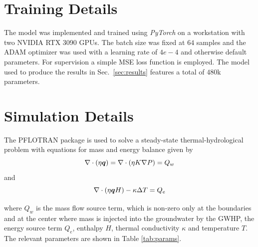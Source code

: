 \documentclass{article} %
\begin{document}



\appendix

\section{Training Details}
\label{ap:training_details}
The model was implemented and trained using \emph{PyTorch} \citep{pytorch} on a workstation with two NVIDIA RTX 3090 GPUs. The batch size was fixed at $64$ samples and the ADAM optimizer was used with a learning rate of $4e-4$ and otherwise default parameters.
For supervision a simple MSE loss function is employed.
The model used to produce the results in Sec.~\ref{sec:results} features a total of $480$k parameters.


\section{Simulation Details}
\label{ap:sim_details}
The PFLOTRAN \citep{pflotran-paper} package is used to solve a steady-state thermal-hydrological problem with equations for mass and energy balance given by
\begin{equation}
   \label{eq:mass}
   \nabla \cdot \left(\eta {\bm{q}} \right) =  \nabla \cdot \left(\eta  K \nabla P  \right) = Q_w
\end{equation}
and
\begin{equation}
   \label{eq:energy}
   \nabla \cdot \left(\eta {\bm{q}} H\right) - \kappa \Delta T = Q_e
\end{equation}

where $Q_w$ is the mass flow source term, which is non-zero only at the boundaries and at the center where mass is injected into the groundwater by the GWHP, the energy source term $Q_e$, enthalpy $H$, thermal conductivity $\kappa$ and temperature $T$. The relevant parameters are shown in Table \ref{tab:params}.
\end{document}
